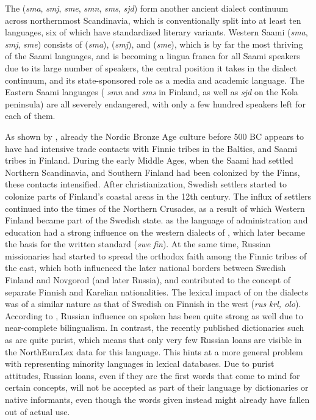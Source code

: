 The  (\textit{sma}, \textit{smj}, \textit{sme}, \textit{smn}, \textit{sms}, \textit{sjd}) form another ancient dialect continuum \citep{sammallahti1998} across northernmost Scandinavia, which is conventionally split into at least ten languages, six of which have standardized literary variants. Western Saami (\textit{sma}, \textit{smj}, \textit{sme}) consists of  (\textit{sma}),  (\textit{smj}), and  (\textit{sme}), which is by far the most thriving of the Saami languages, and is becoming a lingua franca for all Saami speakers due to its large number of speakers, the central position it takes in the dialect continuum, and its state-sponsored role as a media and academic language. The Eastern Saami languages ( \textit{smn} and  \textit{sms} in Finland, as well as  \textit{sjd} on the Kola peninsula) are all severely endangered, with only a few hundred speakers left for each of them.

As shown by \cite{aikio2006contacts}, already the Nordic Bronze Age culture before 500 BC appears to have had intensive trade contacts with Finnic tribes in the Baltics, and Saami tribes in Finland. During the early Middle Ages, when the Saami had settled Northern Scandinavia, and Southern Finland had been colonized by the Finns, these contacts intensified. After christianization, Swedish settlers started to colonize parts of Finland's coastal areas in the 12th century. The influx of settlers continued into the times of the Northern Crusades, as a result of which Western Finland became part of the Swedish state.  as the language of administration and education had a strong influence on the western dialects of , which later became the basis for the written standard (\textit{swe} \arrowLA \textit{fin}). At the same time, Russian missionaries had started to spread the orthodox faith among the Finnic tribes of the east, which both influenced the later national borders between Swedish
Finland and Novgorod (and later Russia), and contributed to the concept of separate Finnish and Karelian nationalities. The lexical impact of  on the  dialects was of a similar nature as that of Swedish on Finnish in the west (\textit{rus} \arrowLA \textit{krl, olo}). According to \cite{puura_ea_2013}, Russian influence on spoken  has been quite strong as well due to near-complete bilingualism. In contrast, the recently published dictionaries such as \cite{zajceva2010} are quite purist, which means that only very few Russian loans are visible in the NorthEuraLex data for this language. This hints at a more general problem with representing minority languages in lexical databases. Due to purist attitudes, Russian loans, even if they are the first words that come to mind for certain concepts, will not be accepted as part of their language by dictionaries or native informants, even though the words given instead might already have fallen out of actual use.

